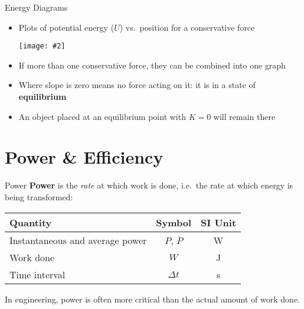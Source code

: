 \documentclass[12pt,compress,aspectratio=169]{beamer}
\newcommand{\pic}[2]{\texttt{[image: \#2]}}
\newcommand{\eq}[2]{\vspace{#1}{\Large\begin{displaymath}#2\end{displaymath}}}
\begin{document}
\begin{frame}{Energy Diagrams}
  \begin{itemize}
  \item Plots of potential energy ($U$) vs.\ position for a conservative force
    \begin{center}
      \pic{.5}{energy-diagram}
    \end{center}
  \item If more than one conservative force, they can be combined into one graph
  \item Where slope is zero means no force acting on it: it is in a state of
    \textbf{equilibrium}
  \item An object placed at an equilibrium point with $K=0$ will remain there
  \end{itemize}
\end{frame}


\section{Power \& Efficiency}

\begin{frame}{Power}
  \textbf{Power} is the \emph{rate} at which work is done, i.e.\ the rate at
  which energy is being transformed:

  \eq{-.2in}{
    \boxed{P(t) = \diff Wt}\quad\quad
    \boxed{\overline{P} = \frac{W}{\Delta t}}
  }
  \begin{center}
    \begin{tabular}{l|c|c}
      \rowcolor{pink}
      \textbf{Quantity}  & \textbf{Symbol} & \textbf{SI Unit} \\ \hline
      Instantaneous and average power & $P$, $\overline{P}$ & \si{\watt} \\
      Work done          & $W$ & \si{\joule} \\
      Time interval      & $\Delta t$ & \si{\second}
    \end{tabular}
  \end{center}
  In engineering, power is often more critical than the actual amount of work
  done.
\end{frame}
\end{document}
